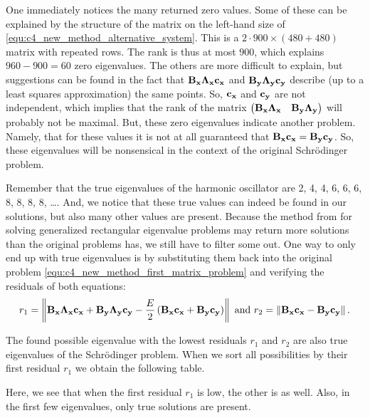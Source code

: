 One immediately notices the many returned zero values. Some of these can be explained by the structure of the matrix on the left-hand size of \eqref{equ:c4_new_method_alternative_system}. This is a $2\cdot 900 \times (480 + 480)$ matrix with repeated rows. The rank is thus at most $900$, which explains $960 - 900 = 60$ zero eigenvalues. The others are more difficult to explain, but suggestions can be found in the fact that $\vb{B_x} \vb{\Lambda_x} \vb{c_x}$ and $\vb{B_y} \vb{\Lambda_y} \vb{c_y}$ describe (up to a least squares approximation) the same points. So, $\vb{c_x}$ and $\vb{c_y}$ are not independent, which implies that the rank of the matrix $\begin{pmatrix} \vb{B_x} \vb{\Lambda_x} & \vb{B_y} \vb{\Lambda_y}\end{pmatrix}$ will probably not be maximal. But, these zero eigenvalues indicate another problem. Namely, that for these values it is not at all guaranteed that $\vb{B_x} \vb{c_x} = \vb{B_y} \vb{c_y}$. So, these eigenvalues will be nonsensical in the context of the original Schrödinger problem.

Remember that the true eigenvalues of the harmonic oscillator are 2, 4, 4, 6, 6, 6, 8, 8, 8, 8, \dots. And, we notice that these true values can indeed be found in our solutions, but also many other values are present. Because the method from \cite{hua_svd_1991} for solving generalized rectangular eigenvalue problems may return more solutions than the original problems has, we still have to filter some out. One way to only end up with true eigenvalues is by substituting them back into the original problem \eqref{equ:c4_new_method_first_matrix_problem} and verifying the residuals of both equations:
$$
    r_1 = \left\| \vb{B_x} \vb{\Lambda_x} \vb{c_x} + \vb{B_y} \vb{\Lambda_y} \vb{c_y} - \frac{E}{2}\left(\vb{B_x}\vb{c_x} + \vb{B_y}\vb{c_y}\right) \right\| \text{ and } r_2=\left\| \vb{B_x} \vb{c_x} - \vb{B_y} \vb{c_y} \right\|\text{.}
$$

The found possible eigenvalue with the lowest residuals $r_1$ and $r_2$ are also true eigenvalues of the Schrödinger problem. When we sort all possibilities by their first residual $r_1$ we obtain the following table.

\begin{center}
    
\end{center}

Here, we see that when the first residual $r_1$ is low, the other is as well. Also, in the first few eigenvalues, only true solutions are present.

